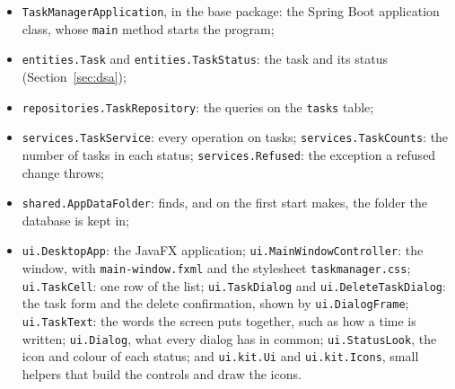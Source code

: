 \begin{itemize}
  \item \texttt{TaskManagerApplication}, in the base package: the Spring Boot application class, whose
        \texttt{main} method starts the program;
  \item \texttt{entities.Task} and \texttt{entities.TaskStatus}: the task and its status (Section~\ref{sec:dsa});
  \item \texttt{repositories.TaskRepository}: the queries on the \texttt{tasks} table;
  \item \texttt{services.TaskService}: every operation on tasks; \texttt{services.TaskCounts}: the number of tasks
        in each status; \texttt{services.Refused}: the exception a refused change throws;
  \item \texttt{shared.AppDataFolder}: finds, and on the first start makes, the folder the database is kept in;
  \item \texttt{ui.DesktopApp}: the JavaFX application; \texttt{ui.MainWindowController}: the window, with
        \texttt{main-window.fxml} and the stylesheet \texttt{taskmanager.css}; \texttt{ui.TaskCell}: one row of the
        list; \texttt{ui.TaskDialog} and \texttt{ui.DeleteTaskDialog}: the task form and the delete confirmation,
        shown by \texttt{ui.DialogFrame}; \texttt{ui.TaskText}: the words the screen puts together, such as how a
        time is written; \texttt{ui.Dialog}, what every dialog has in common; \texttt{ui.StatusLook}, the icon
        and colour of each status; and \texttt{ui.kit.Ui} and \texttt{ui.kit.Icons}, small helpers that build
        the controls and draw the icons.
\end{itemize}

